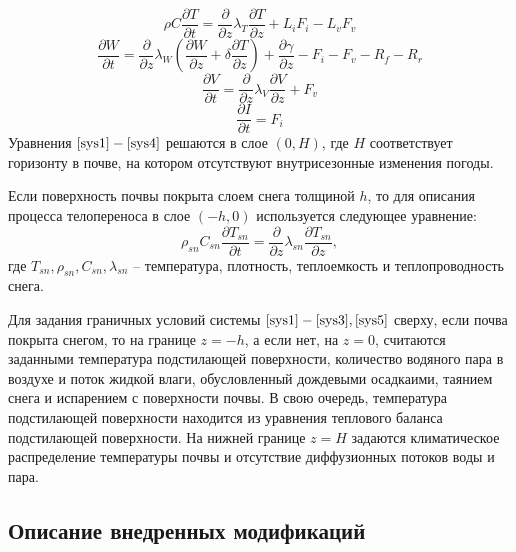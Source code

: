 \documentclass[a4paper, fontsize=14pt]{scrartcl}
\begin{document}
\begin{equation}
    \rho  C \dfrac{\partial T}{\partial t} = \dfrac{\partial }{\partial z} \lambda_T \dfrac{\partial T}{\partial z} + L_i F_i - L_v F_v  \label{sys1}
\end{equation}
\begin{equation}
    \dfrac{\partial W}{\partial t} = \dfrac{\partial }{\partial z} \lambda_W \left( \dfrac{\partial W}{\partial z} + \delta \dfrac{\partial T}{\partial z} \right) + \dfrac{\partial \gamma}{\partial z} - F_i - F_v - R_f - R_r  \label{sys2}
\end{equation}
\begin{equation}
    \dfrac{\partial V}{\partial t} = \dfrac{\partial }{\partial z} \lambda_V \dfrac{\partial V}{\partial z} + F_v  \label{sys3}
\end{equation}
\begin{equation}
    \dfrac{\partial I}{\partial t} = F_i  \label{sys4}
\end{equation}
Уравнения $\eqref{sys1} - \eqref{sys4}$ решаются в слое $(0, H)$, где $H$ соответствует горизонту в почве, на котором отсутствуют внутрисезонные изменения погоды.

Если поверхность почвы покрыта слоем снега толщиной $h$, то для описания процесса телопереноса в слое $(-h, 0)$ используется следующее уравнение:
\begin{equation}
    \rho_{sn} C_{sn} \dfrac{\partial T_{sn}}{\partial t} = \dfrac{\partial }{\partial z} \lambda_{sn} \dfrac{\partial T_{sn}}{\partial z},  \label{sys5}
\end{equation}
где $T_{sn}, \rho_{sn}, C_{sn}, \lambda_{sn}$ -- температура, плотность, теплоемкость и теплопроводность снега.

Для задания граничных условий системы $\eqref{sys1} - \eqref{sys3}, \eqref{sys5}$ сверху, если почва покрыта снегом, то на границе $z = -h$, а если нет, на $z = 0$, считаются заданными температура подстилающей поверхности, количество водяного пара в воздухе и поток жидкой влаги, обусловленный дождевыми осадкаими, таянием снега и испарением с поверхности почвы. В свою очередь, температура подстилающей поверхности находится из уравнения теплового баланса подстилающей поверхности. На нижней границе $z = H$ задаются климатическое распределение температуры почвы и отсутствие диффузионных потоков воды и пара. 

\subsection{Описание внедренных модификаций}
\end{document}

